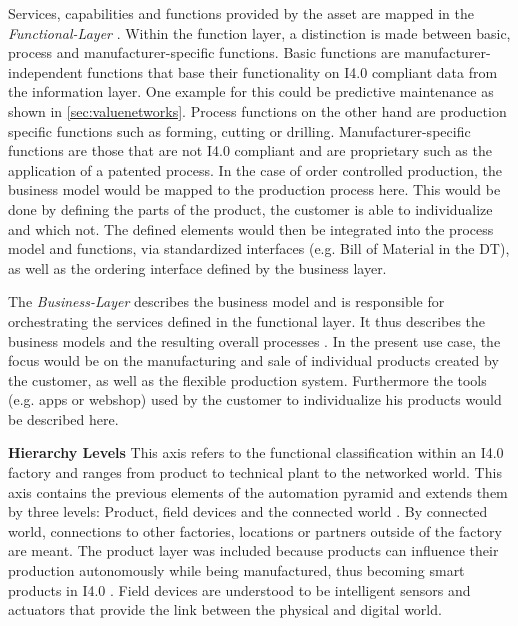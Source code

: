 Services, capabilities and functions provided by the asset are mapped in the \textit{Functional-Layer} \cite[p. 51]{Heidel2017ReferenzarchitekturmodellIndustrie4.0Komponente}. Within the function layer, a distinction is made between basic, process and manufacturer-specific functions. Basic functions are manufacturer-independent functions that base their functionality on \ac{I4.0} compliant data from the information layer. One example for this could be predictive maintenance as shown in \ref{sec:valuenetworks}. Process functions on the other hand are production specific functions such as forming, cutting or drilling. Manufacturer-specific functions are those that are not \ac{I4.0} compliant and are proprietary such as the application of a patented process. In the case of order controlled production, the business model would be mapped to the production process here. This would be done by defining the parts of the product, the customer is able to individualize and which not. The defined elements would then be integrated into the process model and functions, via standardized interfaces (e.g. Bill of Material in the \ac{DT}), as well as the ordering interface defined by the business layer.  
    
The \textit{Business-Layer} describes the business model and is responsible for orchestrating the services defined in the functional layer. It thus describes the business models and the resulting overall processes \cite[p. 53]{Heidel2017ReferenzarchitekturmodellIndustrie4.0Komponente}. In the present use case, the focus would be on the manufacturing and sale of individual products created by the customer, as well as the flexible production system. Furthermore the tools (e.g. apps or webshop) used by the customer to individualize his products would be described here.
    
\textbf{Hierarchy Levels} This axis refers to the functional classification within an \ac{I4.0} factory and ranges from product to technical plant to the networked world. This axis contains the previous elements of the automation pyramid and extends them by three levels: Product, field devices and the connected world \cite[p. 44]{Heidel2017ReferenzarchitekturmodellIndustrie4.0Komponente}. By connected world, connections to other factories, locations or partners outside of the factory are meant. The product layer was included because products can influence their production autonomously while being manufactured, thus becoming smart products in \ac{I4.0} \cite[p. 21]{Acatech2013Recommendations4.0}. Field devices are understood to be intelligent sensors and actuators that provide the link between the physical and digital world.

